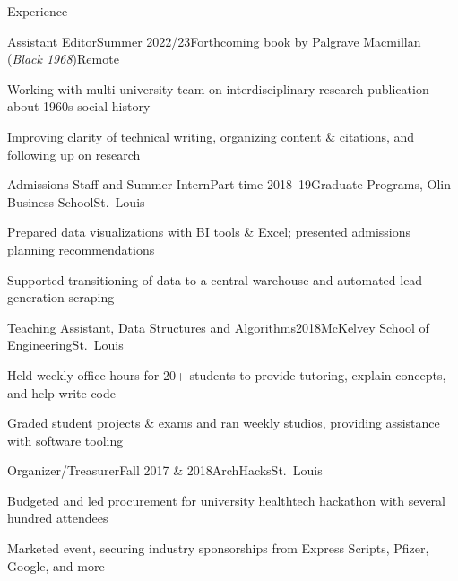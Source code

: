   \begin{rSection}{Experience}

    \begin{rSubsection}{Assistant Editor}{Summer 2022/23}{Forthcoming book by Palgrave Macmillan (\emph{Black 1968})}{Remote}
    \item Working with multi-university team on interdisciplinary research publication about 1960s social history
    \item Improving clarity of technical writing, organizing content \& citations, and following up on research
    \end{rSubsection}

    \begin{rSubsection}{Admissions Staff and Summer Intern}{Part-time 2018--19}{Graduate Programs, Olin Business School}{St.\ Louis}
    \item Prepared data visualizations with BI tools \& Excel; presented admissions planning recommendations
    \item Supported transitioning of data to a central warehouse and automated lead generation scraping
    \end{rSubsection}

    \begin{rSubsection}{Teaching Assistant, Data Structures and Algorithms}{2018}{McKelvey School of Engineering}{St.\ Louis}
    \item Held weekly office hours for 20+ students to provide tutoring, explain concepts, and help write code %
    \item Graded student projects \& exams and ran weekly studios, providing assistance with software tooling %
    \end{rSubsection}

    \begin{rSubsection}{Organizer/Treasurer}{Fall 2017 \& 2018}{ArchHacks}{St.\ Louis}
    \item Budgeted and led procurement for university healthtech hackathon with several hundred attendees
    \item Marketed event, securing industry sponsorships from Express Scripts, Pfizer, Google, and more
    \end{rSubsection}
  \end{rSection}
